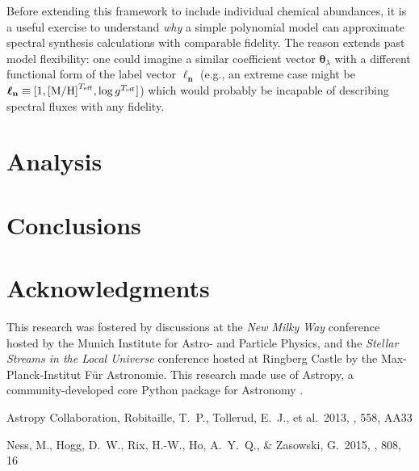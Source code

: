 \documentclass[useAMS,usenatbib]{mn2e}
\newcommand\lv{\mathbf{\boldsymbol\ell_n}}
\newcommand\cv{{\boldsymbol\theta}_\lambda}
\begin{document}
Before extending this framework to include individual chemical abundances, it is
a useful exercise to understand \textit{why} a simple polynomial model can 
approximate spectral synthesis calculations with comparable fidelity. The reason
extends past model flexibility: one could imagine a similar coefficient vector
$\cv$ with a different functional form of the label vector $\lv$ (e.g., an
extreme case might be $\lv \equiv [1, {\rm [M/H]}^{T_{\rm eff}},
\log{g}^{T_{\rm eff}}]$) which would probably be incapable of describing
spectral fluxes with any fidelity.









\section{Analysis}



\section{Conclusions}


\section*{Acknowledgments}
This research was fostered by discussions at the \textit{New Milky Way}
conference hosted by the Munich Institute for Astro- and Particle Physics, and
the \textit{Stellar Streams in the Local Universe} conference hosted at Ringberg
Castle by the Max-Planck-Institut F\"ur Astronomie. This research made use of 
Astropy, a community-developed core Python package for Astronomy \citep{astropy}.

\begin{thebibliography}{99}
 Astropy Collaboration, Robitaille, T.~P., Tollerud, E.~J., et al.\ 2013, \aap, 558, AA33

 Ness, M., Hogg, D.~W., 
Rix, H.-W., Ho, A.~Y.~Q., \& Zasowski, G.\ 2015, \apj, 808, 16 
\end{thebibliography}


\label{lastpage}
\end{document}
